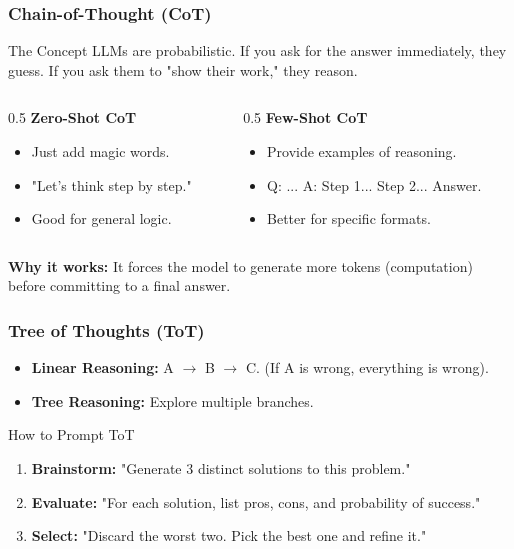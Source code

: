\documentclass{beamer}
\begin{document}
\begin{frame}
    \frametitle{Chain-of-Thought (CoT)}
    \begin{block}{The Concept}
        LLMs are probabilistic. If you ask for the answer immediately, they guess. If you ask them to "show their work," they reason.
    \end{block}
    \begin{columns}
        \begin{column}{0.5\textwidth}
            \textbf{Zero-Shot CoT}
            \begin{itemize}
                \item Just add magic words.
                \item "Let's think step by step."
                \item Good for general logic.
            \end{itemize}
        \end{column}
        \begin{column}{0.5\textwidth}
            \textbf{Few-Shot CoT}
            \begin{itemize}
                \item Provide examples of reasoning.
                \item Q: ... A: Step 1... Step 2... Answer.
                \item Better for specific formats.
            \end{itemize}
        \end{column}
    \end{columns}
    \vspace{0.5cm}
    \textbf{Why it works:} It forces the model to generate more tokens (computation) before committing to a final answer.
\end{frame}

\begin{frame}
    \frametitle{Tree of Thoughts (ToT)}
    \begin{itemize}
        \item \textbf{Linear Reasoning:} A $\to$ B $\to$ C. (If A is wrong, everything is wrong).
        \item \textbf{Tree Reasoning:} Explore multiple branches.
    \end{itemize}
    \begin{block}{How to Prompt ToT}
        \begin{enumerate}
            \item \textbf{Brainstorm:} "Generate 3 distinct solutions to this problem."
            \item \textbf{Evaluate:} "For each solution, list pros, cons, and probability of success."
            \item \textbf{Select:} "Discard the worst two. Pick the best one and refine it."
        \end{enumerate}
    \end{block}
\end{frame}
\end{document}
